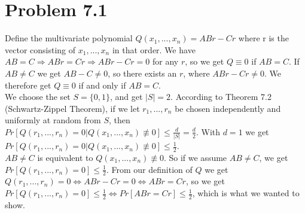 \documentclass[12pt]{article}
\begin{document}
\section*{Problem 7.1}
Define the multivariate polynomial $Q(x_1,...,x_n)=ABr-Cr$ where r is the vector consisting of $x_1,...,x_n$ in that order. We have $AB=C\Rightarrow ABr=Cr\Rightarrow ABr-Cr=0$ for any $r$, so we get $Q\equiv0$ if $AB=C$. If $AB\neq C$ we get $AB-C\neq0$, so there exists an $r$, where $ABr-Cr\neq0$. We therefore get $Q\equiv 0$ if and only if $AB=C$.\\
We choose the set $S=\{0,1\}$, and get $|S|=2$. According to Theorem 7.2 (Schwartz-Zippel Theorem), if we let $r_1,...,r_n$ be chosen independently and uniformly at random from $S$, then $Pr[Q(r_1,...,r_n)=0|Q(x_1,...,x_n)\not\equiv0]\leq\frac{d}{|S|}=\frac{d}{2}$. With $d=1$ we get $Pr[Q(r_1,...,r_n)=0|Q(x_1,...,x_n)\not\equiv0]\leq\frac{1}{2}$.\\
$AB\neq C$ is equivalent to $Q(x_1,...,x_n)\not\equiv0$. So if we assume $AB\neq C$, we get $Pr[Q(r_1,...,r_n)=0]\leq\frac{1}{2}$. From our definition of $Q$ we get $Q(r_1,...,r_n)=0\Leftrightarrow ABr-Cr=0\Leftrightarrow ABr=Cr$, so we get $Pr[Q(r_1,...,r_n)=0]\leq\frac{1}{2}\Leftrightarrow Pr[ABr=Cr]\leq\frac{1}{2}$, which is what we wanted to show.
\end{document}
